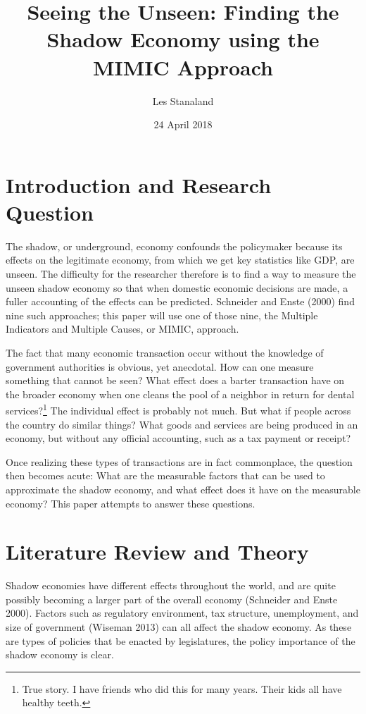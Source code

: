 \documentclass[12pt]{report}
\title{Seeing the Unseen: Finding the Shadow Economy using the MIMIC Approach}
\author{Les Stanaland}
\date{24 April 2018}
\begin{document}
\maketitle

\section*{Introduction and Research Question}

The shadow, or underground, economy confounds the policymaker because its effects on the legitimate economy, from which we get key statistics like GDP, are unseen. The difficulty for the researcher therefore is to find a way to measure the unseen shadow economy so that when domestic economic decisions are made, a fuller accounting of the effects can be predicted. Schneider and Enste (2000) find nine such approaches; this paper will use one of those nine, the Multiple Indicators and Multiple Causes, or MIMIC, approach. 

The fact that many economic transaction occur without the knowledge of government authorities is obvious, yet anecdotal. How can one measure something that cannot be seen? What effect does a barter transaction have on the broader economy when one cleans the pool of a neighbor in return for dental services?\footnote{True story. I have friends who did this for many years. Their kids all have healthy teeth.} The individual effect is probably not much. But what if people across the country do similar things? What goods and services are being produced in an economy, but without any official accounting, such as a tax payment or receipt? 

Once realizing these types of transactions are in fact commonplace, the question then becomes acute: What are the measurable factors that can be used to approximate the shadow economy, and what effect does it have on the measurable economy? This paper attempts to answer these questions. 

\section*{Literature Review and Theory}

Shadow economies have different effects throughout the world, and are quite possibly becoming a larger part of the overall economy (Schneider and Enste 2000). Factors such as regulatory environment, tax structure, unemployment, and size of government (Wiseman 2013) can all affect the shadow economy. As these are types of policies that be enacted by legislatures, the policy importance of the shadow economy is clear.
\end{document}
